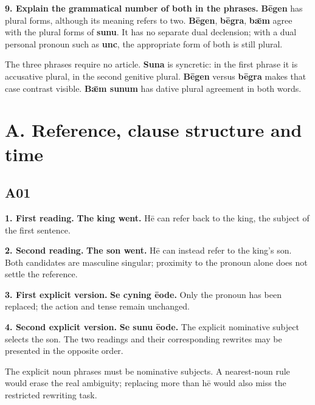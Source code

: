 \textbf{9. Explain the grammatical number of both in the phrases.} \textbf{Bēgen} has plural forms, although its meaning refers to two. \textbf{Bēgen}, \textbf{bēgra}, \textbf{bǣm} agree with the plural forms of \textbf{sunu}. It has no separate dual declension; with a dual personal pronoun such as \textbf{unc}, the appropriate form of both is still plural.

The three phrases require no article. \textbf{Suna} is syncretic: in the first phrase it is accusative plural, in the second genitive plural. \textbf{Bēgen} versus \textbf{bēgra} makes that case contrast visible. \textbf{Bǣm sunum} has dative plural agreement in both words.

\section*{A. Reference, clause structure and time}

\subsection*{A01}

\textbf{1. First reading.} \textbf{The king went.} Hē can refer back to the king, the subject of the first sentence.

\textbf{2. Second reading.} \textbf{The son went.} Hē can instead refer to the king’s son. Both candidates are masculine singular; proximity to the pronoun alone does not settle the reference.

\textbf{3. First explicit version.} \textbf{Se cyning ēode.} Only the pronoun has been replaced; the action and tense remain unchanged.

\textbf{4. Second explicit version.} \textbf{Se sunu ēode.} The explicit nominative subject selects the son. The two readings and their corresponding rewrites may be presented in the opposite order.

The explicit noun phrases must be nominative subjects. A nearest-noun rule would erase the real ambiguity; replacing more than hē would also miss the restricted rewriting task.

